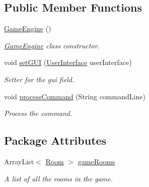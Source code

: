 \subsection*{Public Member Functions}
\begin{DoxyCompactItemize}
\item 
\hyperlink{classGameEngine_a9e8a92f5021a34293060f9aaff4005de}{Game\-Engine} ()
\begin{DoxyCompactList}\small\item\em \hyperlink{classGameEngine}{Game\-Engine} class constructor. \end{DoxyCompactList}\item 
void \hyperlink{classGameEngine_aec901a5b590b3cd204f196165da5dfb6}{set\-G\-U\-I} (\hyperlink{classUserInterface}{User\-Interface} user\-Interface)
\begin{DoxyCompactList}\small\item\em Setter for the gui field. \end{DoxyCompactList}\item 
void \hyperlink{classGameEngine_ad7133885f313fa99bca3bb7cb8272f64}{process\-Command} (String command\-Line)
\begin{DoxyCompactList}\small\item\em Process the command. \end{DoxyCompactList}\end{DoxyCompactItemize}
\subsection*{Package Attributes}
\begin{DoxyCompactItemize}
\item 
Array\-List$<$ \hyperlink{classpkg__world_1_1Room}{Room} $>$ \hyperlink{classGameEngine_ae5a2f252ec103e0630aebb8635341ea4}{game\-Rooms}
\begin{DoxyCompactList}\small\item\em A list of all the rooms in the game. \end{DoxyCompactList}\end{DoxyCompactItemize}
